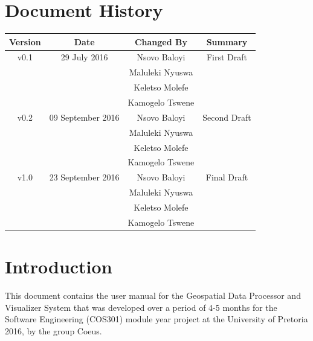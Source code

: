 \documentclass[a4paper,12pt]{article}
\begin{document}
	\newpage
	
	\tableofcontents
	\newpage
	\section*{Document History}
	
	\begin{table}[h!]
		
		\centering %
		\begin{tabular}{c c c c} %
			\hline\hline %
			Version & Date & Changed By & Summary \\ [0.5ex] %
			\hline %
			v0.1 & 29 July 2016 & Nsovo Baloyi & First Draft 
			\\ & & Maluleki Nyuswa &  
			\\ & & Keletso Molefe &
			\\ & & Kamogelo Tswene & \\ [1ex] 
			\hline
			v0.2 & 09 September 2016 & Nsovo Baloyi & Second Draft 
			\\ & & Maluleki Nyuswa &  
			\\ & & Keletso Molefe &
			\\ & & Kamogelo Tswene & \\ [1ex] 
			\hline
			v1.0 & 23 September 2016 & Nsovo Baloyi & Final Draft 
			\\ & & Maluleki Nyuswa &  
			\\ & & Keletso Molefe &
			\\ & & Kamogelo Tswene & \\ [1ex] 
			\hline \hline
		\end{tabular}
		\label{table:nonlin} %
	\end{table}

	\newpage
	
	\section{Introduction}
	This document contains the user manual for the Geospatial Data Processor and Visualizer System that was developed over a period of 4-5 months for the Software Engineering (COS301) module year project at the University of Pretoria 2016, by the group Coeus.
	
\end{document}
